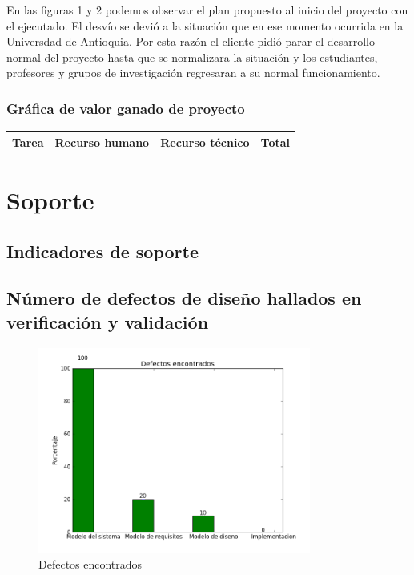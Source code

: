 \documentclass[12pt,oneside,letterpaper]{report}
\begin{document}
\maketitle En las figuras 1 y 2 podemos observar el plan propuesto al inicio del proyecto con el ejecutado. El desvío se devió a la situación que en ese momento ocurrida en la Universdad de Antioquia. Por esta razón el cliente pidió parar el desarrollo normal del proyecto hasta que se normalizara la situación y los estudiantes, profesores y grupos de investigación regresaran a su normal funcionamiento.

\subsubsection{Gráfica de valor ganado de proyecto}

\begin{center}
\begin{tabular}{| c | c | c | c |}
\hline
Tarea & Recurso humano & Recurso técnico & Total \\
\hline

\hline
\end{tabular}
\end{center}

\section{Soporte}
\subsection{Indicadores de soporte}
\subsection{Número de defectos de diseño hallados en verificación y validación}

\begin{figure}[h!]
  \centering
    \includegraphics[width=0.80\textwidth]{./img/barras/barras.png}
  \caption{Defectos encontrados}
\end{figure}
\end{document}
